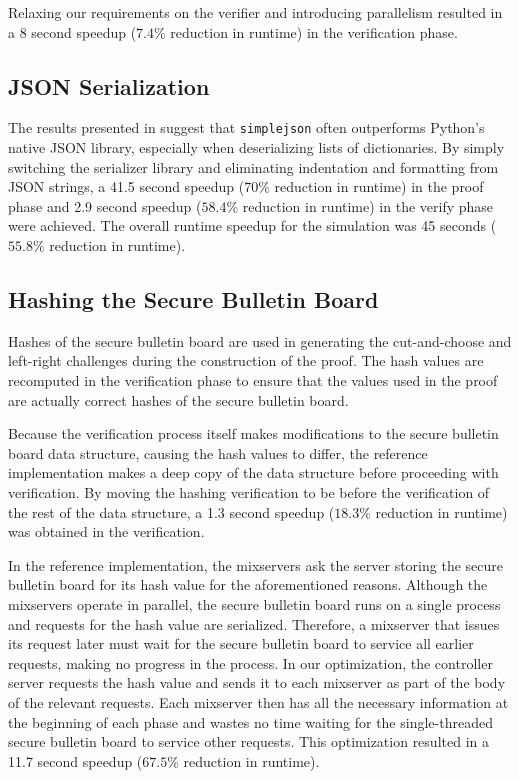Relaxing our requirements on the verifier and introducing parallelism resulted in a 8 second speedup ($7.4\%$ reduction in runtime) in the verification phase.

\subsection{JSON Serialization} \label{perf:optimizations:json}

The results presented in \cite{json-bench} suggest that \texttt{simplejson} often outperforms Python's native JSON library, especially when deserializing lists of dictionaries. By simply switching the serializer library and eliminating indentation and formatting from JSON strings, a 41.5 second speedup ($70\%$ reduction in runtime) in the proof phase and 2.9 second speedup ($58.4\%$ reduction in runtime) in the verify phase were achieved. The overall runtime speedup for the simulation was 45 seconds ($55.8\%$ reduction in runtime).

\subsection{Hashing the Secure Bulletin Board} \label{perf:optimizations:sbb}

Hashes of the secure bulletin board are used in generating the cut-and-choose and left-right challenges during the construction of the proof. The hash values are recomputed in the verification phase to ensure that the values used in the proof are actually correct hashes of the secure bulletin board.

Because the verification process itself makes modifications to the secure bulletin board data structure, causing the hash values to differ, the reference implementation makes a deep copy of the data structure before proceeding with verification. By moving the hashing verification to be before the verification of the rest of the data structure, a 1.3 second speedup ($18.3\%$ reduction in runtime) was obtained in the verification.

In the reference implementation, the mixservers ask the server storing the secure bulletin board for its hash value for the aforementioned reasons. Although the mixservers operate in parallel, the secure bulletin board runs on a single process and requests for the hash value are serialized. Therefore, a mixserver that issues its request later must wait for the secure bulletin board to service all earlier requests, making no progress in the process. In our optimization, the controller server requests the hash value and sends it to each mixserver as part of the body of the relevant requests. Each mixserver then has all the necessary information at the beginning of each phase and wastes no time waiting for the single-threaded secure bulletin board to service other requests. This optimization resulted in a 11.7 second speedup ($67.5\%$ reduction in runtime).

